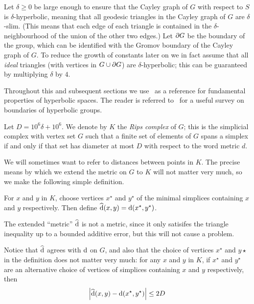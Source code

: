 \documentclass[a4paper]{article}
\begin{document}
Let $\delta \geq 0$ be large enough to ensure that the Cayley graph of $G$ with
respect to $S$ is $\delta$-hyperbolic, meaning that all geodesic triangles in
the Cayley graph of $G$ are $\delta$-slim. (This means that each edge of each
triangle is contained in the $\delta$-neighbourhood of the union of the other
two edges.) Let $\partial G$ be the boundary of the group, which can be
identified with the Gromov boundary of the Cayley graph of $G$. To reduce the
growth of constants later on we in fact assume that all \emph{ideal} triangles
(with vertices in $G \cup \partial G$) are $\delta$-hyperbolic; this can be
guaranteed by multiplying $\delta$ by $4$.  

Throughout this and subsequent sections we use~\cite{bridsonhaefliger99} as a
reference for fundamental properties of hyperbolic spaces. The reader is
referred to~\cite{benaklikapovich00} for a useful survey on boundaries of
hyperbolic groups.

\begin{definition}
  Let $D = 10^6\delta + 10^6$.  We denote by $K$ the \emph{Rips complex} of
  $G$; this is the simplicial complex with vertex set $G$ such that a finite
  set of elements of $G$ spans a simplex if and only if that set has diameter
  at most $D$ with respect to the word metric $d$.
\end{definition}

We will sometimes want to refer to distances between points in $K$. The
precise means by which we extend the metric on $G$ to $K$ will not matter
very much, so we make the following simple definition.

\begin{definition}
  For $x$ and $y$ in $K$, choose vertices $x^\star$ and $y^\star$ of the
  minimal simplices containing $x$ and $y$ respectively. Then define
  $\operatorname{\widehat{d}}(x,y) = \operatorname{d}(x^\star, y^\star)$.  
\end{definition}

\begin{remark}\label{rem:dist_vs_newdist}
  The extended ``metric'' $\operatorname{\widehat{d}}$ is not a metric, since it only satisifes
  the triangle inequality up to a bounded additive error, but this will not
  cause a problem.

  Notice that $\operatorname{\widehat{d}}$ agrees with $\operatorname{d}$ on $G$, and also that the choice
  of vertices $x^\star$ and $y\star$ in the definition does not matter very
  much: for any $x$ and $y$ in $K$, if $x^\star$ and $y^\star$ are an
  alternative choice of vertices of simplices containing $x$ and $y$
  respectively, then
  \begin{equation*}
    \left|\operatorname{\widehat{d}}(x,y) - \operatorname{d}(x^\star, y^\star)\right| \leq 2D
  \end{equation*}
\end{remark}
\end{document}
